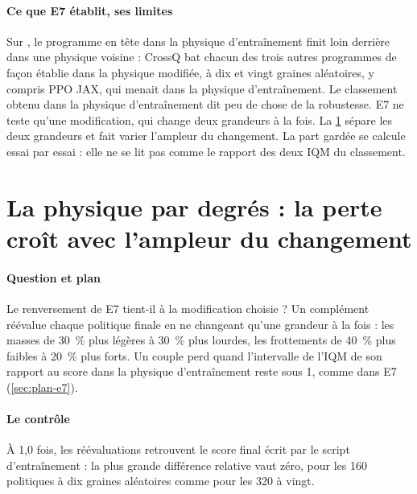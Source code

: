\paragraph{Ce que E7 établit, ses limites}
Sur , le programme en tête dans la physique d'entraînement finit loin derrière dans une physique
voisine : CrossQ bat chacun des trois autres programmes de façon établie dans la physique modifiée, à dix et
vingt graines aléatoires, y compris PPO JAX, qui menait dans la physique d'entraînement. Le classement obtenu
dans la physique d'entraînement dit peu de chose de la robustesse. E7 ne teste qu'une modification, qui change
deux grandeurs à la fois. La \cref{sec:dose} sépare les deux grandeurs et fait varier l'ampleur du changement. La part gardée se calcule essai par essai :
elle ne se lit pas comme le rapport des deux IQM du classement.

\section{La physique par degrés : la perte croît avec l'ampleur du changement}\label{sec:dose}

\paragraph{Question et plan}
Le renversement de E7 tient-il à la modification choisie ? Un complément réévalue chaque politique finale en ne changeant qu'une grandeur à la fois : les masses de 30~\% plus légères à 30~\% plus
lourdes, les frottements de 40~\% plus faibles à 20~\% plus forts. Un couple perd quand l'intervalle de l'IQM
de son rapport au score dans la physique d'entraînement reste sous 1, comme dans E7 (\cref{sec:plan-e7}).

\paragraph{Le contrôle}
À 1,0 fois, les réévaluations retrouvent le score final écrit par le script d'entraînement : la plus grande différence
relative vaut zéro, pour les 160 politiques à dix graines aléatoires comme pour les 320 à vingt.

